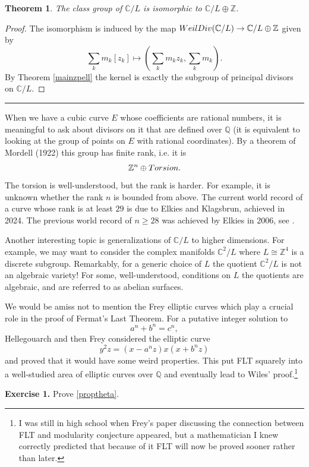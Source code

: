 \documentclass[11pt]{article}
\numberwithin{equation}{section}
\numberwithin{footnote}{section}
\newtheorem{thm}{Theorem}[section]
\newcommand{\blue}{\color{blue}}
\newcommand{\red}{\color{red}}
\newcommand{\Q}{{\mathbb Q}}
\newcommand{\Z}{{\mathbb Z}}
\newcommand{\C}{{\mathbb C}}
\begin{document}
\begin{thm}
The class group of $\C/L$ is isomorphic to $\C/L\oplus \Z$.
\end{thm}

\begin{proof}
The isomorphism is induced by the map ${\rm WeilDiv}(\C/L)\to \C/L\oplus \Z$ given by
$$
\sum_{k}m_k[z_k]\mapsto \left(\sum_k m_kz_k,\sum_k m_k\right).
$$
By Theorem \ref{mainzpell} the kernel is exactly the subgroup of principal divisors on $\C/L$.
\end{proof}

\smallskip
{\blue \hrule}
When we have a cubic curve $E$ whose coefficients are rational numbers, it is meaningful to ask about divisors on it that are defined over $\Q$ (it is equivalent to looking at the group of points on $E$ with rational coordinates). By a theorem of Mordell (1922) this group has finite rank, i.e. it is 
$$\Z^{n}\oplus{\rm Torsion}.$$
The torsion is well-understood, but the rank is harder. For example, it is unknown whether the rank $n$ is bounded from above. The current world record of a curve whose rank is at least $29$ is due to Elkies and Klagsbrun, achieved in 2024. The previous world record of $n\geq 28$ was achieved by Elkies in 2006, see \cite{Elkies}.

\smallskip
Another interesting topic is generalizations of $\C/L$ to higher dimensions. For example, we may want to consider the complex manifolds $\C^2/L$ where $L\cong \Z^4$ is a discrete subgroup. Remarkably, for a generic choice of $L$ the quotient $\C^2/L$ is {\red not an algebraic variety!} For some, well-understood, conditions on $L$ the quotients are algebraic, and are referred to as {\blue abelian surfaces}.

\smallskip
We would be amiss not to mention the Frey elliptic curves which play a crucial role in the proof of Fermat's Last Theorem. For a putative integer solution to 
$$
a^n+b^n=c^n,
$$
Hellegouarch \cite{Hellegouarch} and then Frey \cite{Frey1,Frey2} considered the elliptic curve 
$$
y^2 z = (x - a^n z) x (x +b^n z)
$$
and proved that it would have some weird properties. This put  FLT squarely into a well-studied area of elliptic curves over $\Q$ and eventually lead to Wiles' proof.\footnote{ I was still in high school when Frey's paper discussing the connection between FLT and modularity conjecture appeared, but a mathematician I knew correctly predicted that because of it FLT will now be proved sooner rather than later.}


{\bf Exercise 1.} Prove \eqref{proptheta}.
\end{document}
